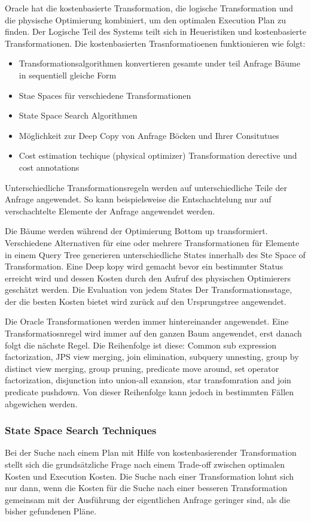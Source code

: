 Oracle hat die kostenbasierte Transformation, die logische Transformation und die physische Optimierung kombiniert, um den optimalen Execution Plan zu finden. Der Logische Teil des Systems teilt sich in Heueristiken und kostenbasierte Transformationen. Die kostenbasierten Trasnformatioenen funktionieren wie folgt:

\begin{itemize}
\item Transformationsalgorithmen konvertieren gesamte under teil Anfrage Bäume in sequentiell gleiche Form
\item Stae Spaces für verschiedene Transformationen
\item State Space Search Algorithmen
\item Möglichkeit zur Deep Copy von Anfrage Böcken und Ihrer Consitutues
\item Cost estimation techique (physical optimizer)
Transformation derective und cost annotations
\end{itemize}

Unterschiedliche Transformationsregeln werden auf unterschiedliche Teile der Anfrage angewendet. So kann beispielsweise die Entschachtelung nur auf verschachtelte Elemente der Anfrage angewendet werden. 

Die Bäume werden während der Optimierung Bottom up transformiert. Verschiedene Alternativen für eine oder mehrere Transformationen für Elemente in einem Query Tree generieren unterschiedliche States innerhalb des Ste Space of Transformation. Eine Deep kopy wird gemacht bevor ein bestimmter Status erreicht wird und dessen Kosten durch den Aufruf des physischen Optimierers geschätzt werden. Die Evaluation von jedem States Der Transformationsstage, der die besten Kosten bietet wird zurück auf den Ursprungstree angewendet.

Die Oracle Transformationen werden immer hintereinander angewendet. Eine Transformatiosnregel wird immer auf den ganzen Baum angewendet, erst danach folgt die nächste Regel. Die Reihenfolge ist diese: Common sub expression factorization, JPS view merging, join elimination, subquery unnesting, group by distinct view merging, group pruning, predicate move around, set operator factorization, disjunction into union-all exansion, star transfomration and join predicate pushdown. Von dieser Reihenfolge kann jedoch in bestimmten Fällen abgewichen werden. 



\subsubsection{State Space Search Techniques}
Bei der Suche nach einem Plan mit Hilfe von kostenbasierender Transformation stellt sich die grundsätzliche Frage nach einem Trade-off zwischen optimalen Kosten und Execution Kosten. Die Suche nach einer Transformation lohnt sich nur dann, wenn die Kosten für die Suche nach einer besseren Transformation gemeinsam mit der Ausführung der eigentlichen Anfrage geringer sind, als die bisher gefundenen Pläne.

